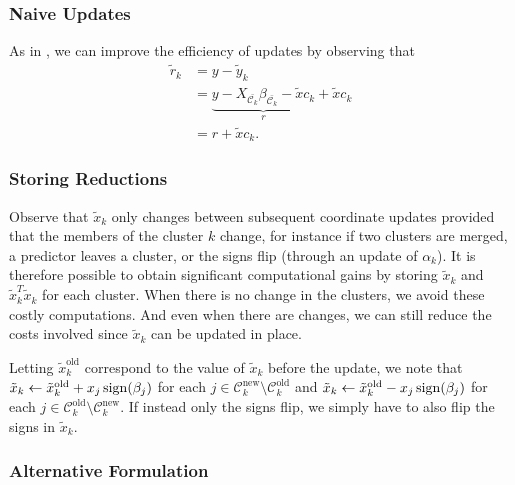 \subsubsection{Naive Updates}

As in \textcite{friedman2010}, we can improve the efficiency of updates by observing that
\begin{equation}
  \begin{aligned}
    \tilde r_k & = y - \tilde y_k                                                     \\
               & = \underbrace{y - X_{\bar{\mathcal{C}_k}}\beta_{\bar{\mathcal{C}_k}}
    - \tilde x c_k}_r + \tilde x c_k                                                  \\
               & = r + \tilde x c_k.
  \end{aligned}
\end{equation}

\subsubsection{Storing Reductions}

Observe that \(\tilde x_k\) only changes between subsequent coordinate updates provided that the members of the cluster \(k\) change, for instance if two clusters are merged, a predictor leaves a cluster, or the signs flip (through an update of \(\alpha_k\)).
It is therefore possible to obtain significant computational gains by storing \(\tilde x_k\) and \(\tilde x_k^T \tilde x_k\) for each cluster. When there is no change in the clusters, we avoid these costly computations. And even when there are changes, we can still reduce the costs involved since \(\tilde x_k\) can be updated in place.

Letting \(\tilde x_k^\text{old}\) correspond to the value of \(\tilde x_k\) before the update, we note that
\(\tilde x_k \gets \tilde x_k^\text{old} + x_j \operatorname{sign}(\beta_j)\)
for each \(j \in \mathcal{C}_k^\text{new} \setminus \mathcal{C}_k^\text{old}\)
and \(\tilde x_k \gets \tilde x_k^\text{old} - x_j \operatorname{sign}(\beta_j)\) for each
\(j \in \mathcal{C}_k^\text{old} \setminus \mathcal{C}_k^\text{new}\). 
If instead only the signs flip, we simply have to also flip the signs in \(\tilde x_k\).


\subsubsection{Alternative Formulation}

